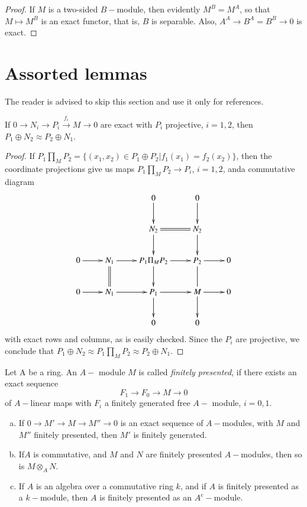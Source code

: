\begin{proof}
If $M$ is a two-sided $B-$module, then evidently $M^B = M^A$, so that
$M \mapsto M^B$ is an exact functor, that is, $B$ is separable. Also,
$A^A \to B^A = B^B \to 0$ is exact. 
\end{proof}


\section{Assorted lemmas}\label{chap3:sec2}%
The reader is advised to skip this section and use it only for
references.  

\begin{lemma} %
If $0 \to N_i \to P_i \xrightarrow{f_i} M \to
    0$ are exact with $P_i$ projective, $ i = 1, 2$, then $P_1
    \oplus N_2 \approx P_2 \oplus N_1$. 
\end{lemma}

\begin{proof}
If $P_1 \prod\limits_M P_2 = \{(x_1, x_2) \in P_1 \oplus P_2 \big| f_1
(x_1) = f_2 (x_2) \}$, then the coordinate projections give us maps
$P_1 \prod_M P_2 \to P_i$, $i = 1, 2$, and\pageoriginale a commutative
diagram   
\[
\xymatrix{
& & 0 \ar[d] & 0 \ar[d]& \\
& & N_2 \ar[d] \ar@{=}[r] & N_2 \ar[d] & \\
0 \ar[r] & N_1 \ar[r] \ar@{=}[d] & P_1 \Pi_M P_2 \ar[d] \ar[r] & P_2
\ar[r] \ar@{-}[d] & 0 \\
0 \ar[r] & N_1 \ar[r] & P_1 \ar[r] \ar[d] & M \ar[r] \ar[d] & 0\\
& & 0 & 0 & 
}
\]
with exact rows and columns, as is easily checked. Since the $P_i$ are
projective, we conclude that $P_1 \oplus N_2 \approx P_1 \prod
\limits_M P_2 \approx P_2 \oplus N_1$. 
\end{proof}

Let A be a ring. An $A-$ module $M$ is called \textit{finitely
  presented}, if there exists an exact sequence 
$$
F_1 \to F_0 \to M \to 0
$$
of $A-$linear maps with $F_i$ a finitely generated free $A-$ module,
$i= 0, 1$. 

\setcounter{coro}{1}
\begin{coro} %
\begin{enumerate}[(a)]
\item If $ 0 \to M' \to M \to M'' \to 0 $ is an exact sequence of
  $A-$modules, with $M$ and $M''$ finitely presented, then $M'$ is 
  finitely generated. 

\item If\pageoriginale $A$ is commutative, and $M$ and $N$ are
  finitely presented $A-$modules, then so is $M \otimes_A N$.  

\item If $A$ is an algebra over a commutative ring $k$, and if $A$ is
  finitely presented as a $k-$module, then $A$ is finitely presented
  as an $A^e-$module. 
\end{enumerate}
\end{coro}

